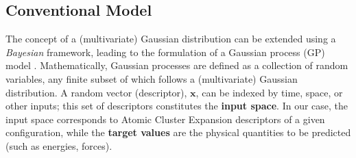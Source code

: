 \subsection{Conventional Model} \label{sec:2.3.1}
The concept of a (multivariate) Gaussian distribution can be extended using a \textit{Bayesian} framework, leading to the formulation of a Gaussian process (GP) model \cite{RasmussenW06}.
Mathematically, Gaussian processes are defined as a collection of random variables, any finite subset of which follows a (multivariate) Gaussian distribution.
A random vector (descriptor), $\mathbf{x}$, can be indexed by time, space, or other inputs; this set of descriptors constitutes the \textbf{input space}.
In our case, the input space corresponds to Atomic Cluster Expansion descriptors of a given configuration, while the \textbf{target values} are the physical quantities to be predicted (such as energies, forces).


